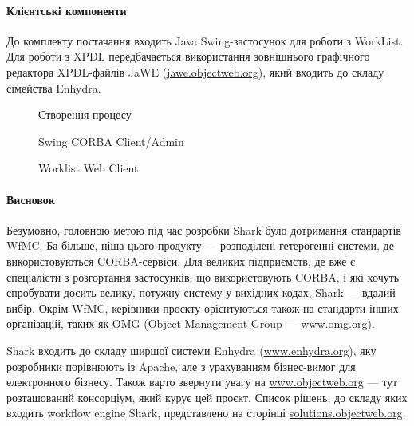 \documentclass{memoir}
\begin{document}
\paragraph{Клієнтські компоненти}

До комплекту постачання входить Java Swing-застосунок для роботи з WorkList. Для роботи з XPDL передбачається використання зовнішнього графічного редактора XPDL-файлів JaWE (\url{jawe.objectweb.org}), який входить до складу сімейства Enhydra.

\begin{figure}[h]
    \centering
    \caption{Створення процесу}
    \label{fig:shark_process_creation}
\end{figure}

\begin{figure}[h]
    \centering
    \caption{Swing CORBA Client/Admin}
    \label{fig:shark_swing_client}
\end{figure}

\begin{figure}[h]
    \centering
    \caption{Worklist Web Client}
    \label{fig:shark_worklist_web}
\end{figure}

\paragraph{Висновок}

Безумовно, головною метою під час розробки Shark було дотримання стандартів WfMC. Ба більше, ніша цього продукту — розподілені гетерогенні системи, де використовуються CORBA-сервіси. Для великих підприємств, де вже є спеціалісти з розгортання застосунків, що використовують CORBA, і які хочуть спробувати досить велику, потужну систему у вихідних кодах, Shark — вдалий вибір. Окрім WfMC, керівники проєкту орієнтуються також на стандарти інших організацій, таких як OMG (Object Management Group — \url{www.omg.org}).

Shark входить до складу ширшої системи Enhydra (\url{www.enhydra.org}), яку розробники порівнюють із Apache, але з урахуванням бізнес-вимог для електронного бізнесу. Також варто звернути увагу на \url{www.objectweb.org} — тут розташований консорціум, який курує цей проєкт. Список рішень, до складу яких входить workflow engine Shark, представлено на сторінці \url{solutions.objectweb.org}.
\end{document}
